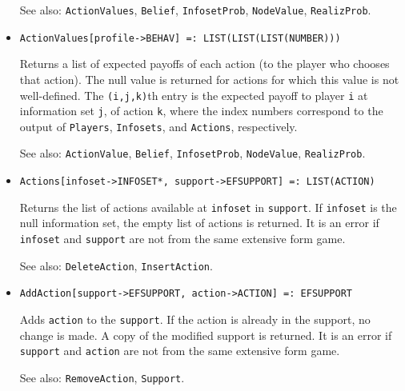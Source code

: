 \begin{itemize}
\item [See also:] \verb+ActionValues+, \verb+Belief+,
\verb+InfosetProb+, \verb+NodeValue+, \verb+RealizProb+.  
\ed

\item{}
\protect \large \begin{verbatim}
ActionValues[profile->BEHAV] =: LIST(LIST(LIST(NUMBER))) 
\end{verbatim}\normalsize

\bd
Returns a list of expected payoffs of each action (to the player
who chooses that action).  The null value is returned for actions for
which this value is not well-defined.  The \verb+(i,j,k)+th entry is
the expected payoff to player \verb+i+ at information set \verb+j+, of
action \verb+k+, where the index numbers correspond to the output of
\verb+Players+, \verb+Infosets+, and \verb+Actions+, respectively.

\item [See also:] \verb+ActionValue+, \verb+Belief+,
\verb+InfosetProb+, \verb+NodeValue+, \verb+RealizProb+.  
\ed

\item{}
\protect \large \begin{verbatim} 
Actions[infoset->INFOSET*, support->EFSUPPORT] =: LIST(ACTION) 
\end{verbatim}\normalsize

\bd
Returns the list of actions available at \verb+infoset+ in
\verb+support+.  If \verb+infoset+ is the null information set, the
empty list of actions is returned.  It is an error if \verb+infoset+
and \verb+support+ are not from the same extensive form game.

\item [See also:] \verb+DeleteAction+, \verb+InsertAction+.
\ed

\item{}
\protect \large \begin{verbatim} 
AddAction[support->EFSUPPORT, action->ACTION] =: EFSUPPORT 
\end{verbatim}\normalsize

\bd 
{}
Adds \verb+action+ to the \verb+support+.  If the action is already in
the support, no change is made.  A copy of the modified support is
returned.  It is an error if \verb+support+ and \verb+action+ are not from the
same extensive form game.

\item [See also:] \verb+RemoveAction+, \verb+Support+.
\ed


\end{itemize}
